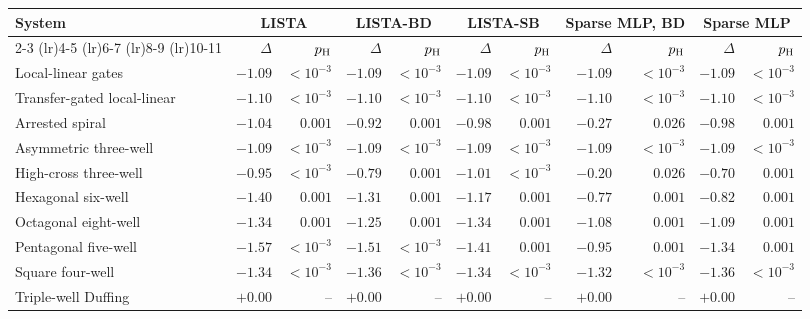 \begin{tabular}{@{}l rr rr rr rr rr@{}}
\toprule
System & \multicolumn{2}{c}{LISTA} & \multicolumn{2}{c}{LISTA-BD} & \multicolumn{2}{c}{LISTA-SB} & \multicolumn{2}{c}{Sparse MLP, BD} & \multicolumn{2}{c}{Sparse MLP} \\
\cmidrule(lr){2-3} \cmidrule(lr){4-5} \cmidrule(lr){6-7} \cmidrule(lr){8-9} \cmidrule(lr){10-11}
 & $\Delta$ & $p_{\rm H}$ & $\Delta$ & $p_{\rm H}$ & $\Delta$ & $p_{\rm H}$ & $\Delta$ & $p_{\rm H}$ & $\Delta$ & $p_{\rm H}$ \\
\midrule
Local-linear gates & $\mathbf{-1.09}$ & $<\!10^{-3}$ & $\mathbf{-1.09}$ & $<\!10^{-3}$ & $\mathbf{-1.09}$ & $<\!10^{-3}$ & $\mathbf{-1.09}$ & $<\!10^{-3}$ & $\mathbf{-1.09}$ & $<\!10^{-3}$ \\
Transfer-gated local-linear & $\mathbf{-1.10}$ & $<\!10^{-3}$ & $\mathbf{-1.10}$ & $<\!10^{-3}$ & $\mathbf{-1.10}$ & $<\!10^{-3}$ & $\mathbf{-1.10}$ & $<\!10^{-3}$ & $\mathbf{-1.10}$ & $<\!10^{-3}$ \\
Arrested spiral & $\mathbf{-1.04}$ & $0.001$ & $\mathbf{-0.92}$ & $0.001$ & $\mathbf{-0.98}$ & $0.001$ & $\mathbf{-0.27}$ & $0.026$ & $\mathbf{-0.98}$ & $0.001$ \\
Asymmetric three-well & $\mathbf{-1.09}$ & $<\!10^{-3}$ & $\mathbf{-1.09}$ & $<\!10^{-3}$ & $\mathbf{-1.09}$ & $<\!10^{-3}$ & $\mathbf{-1.09}$ & $<\!10^{-3}$ & $\mathbf{-1.09}$ & $<\!10^{-3}$ \\
High-cross three-well & $\mathbf{-0.95}$ & $<\!10^{-3}$ & $\mathbf{-0.79}$ & $0.001$ & $\mathbf{-1.01}$ & $<\!10^{-3}$ & $\mathbf{-0.20}$ & $0.026$ & $\mathbf{-0.70}$ & $0.001$ \\
Hexagonal six-well & $\mathbf{-1.40}$ & $0.001$ & $\mathbf{-1.31}$ & $0.001$ & $\mathbf{-1.17}$ & $0.001$ & $\mathbf{-0.77}$ & $0.001$ & $\mathbf{-0.82}$ & $0.001$ \\
Octagonal eight-well & $\mathbf{-1.34}$ & $0.001$ & $\mathbf{-1.25}$ & $0.001$ & $\mathbf{-1.34}$ & $0.001$ & $\mathbf{-1.08}$ & $0.001$ & $\mathbf{-1.09}$ & $0.001$ \\
Pentagonal five-well & $\mathbf{-1.57}$ & $<\!10^{-3}$ & $\mathbf{-1.51}$ & $<\!10^{-3}$ & $\mathbf{-1.41}$ & $0.001$ & $\mathbf{-0.95}$ & $0.001$ & $\mathbf{-1.34}$ & $0.001$ \\
Square four-well & $\mathbf{-1.34}$ & $<\!10^{-3}$ & $\mathbf{-1.36}$ & $<\!10^{-3}$ & $\mathbf{-1.34}$ & $<\!10^{-3}$ & $\mathbf{-1.32}$ & $<\!10^{-3}$ & $\mathbf{-1.36}$ & $<\!10^{-3}$ \\
Triple-well Duffing & $+0.00$ & -- & $+0.00$ & -- & $+0.00$ & -- & $+0.00$ & -- & $+0.00$ & -- \\

\end{tabular}
